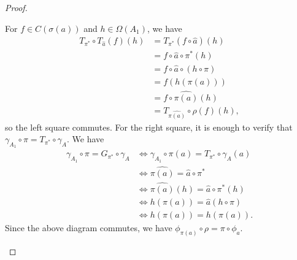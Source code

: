 \documentclass[10pt]{mypackage}
\begin{document}
\begin{proof}
\begin{enumerate}[(1)]
      For $f\in C\left(\sigma\left(a\right)\right)$ and $h\in \Omega\left(A_1\right)$, we have
      \begin{align*}
        T_{\pi^{\ast}}\circ T_{\hat{a}}\left(f\right)\left(h\right) &= T_{\pi^{\ast}}\left(f\circ \hat{a}\right)\left(h\right)\\
                                                                    &= f\circ\hat{a}\circ\pi^{\ast}\left(h\right)\\
                                                                    &= f\circ\hat{a}\circ\left(h\circ\pi\right)\\
                                                                    &= f\left(h\left(\pi\left(a\right)\right)\right)\\
                                                                    &= f\circ \widehat{\pi\left(a\right)}\left(h\right)\\
                                                                    &= T_{\widehat{\pi\left(a\right)}}\circ \rho\left(f\right)\left(h\right),
      \end{align*}
      so the left square commutes. For the right square, it is enough to verify that $\gamma_{A_1}\circ\pi = T_{\pi^{\ast}}\circ \gamma_A$. We have
      \begin{align*}
        \gamma_{A_1}\circ\pi = G_{\pi^{\ast}}\circ\gamma_A &\Leftrightarrow \gamma_{A_1}\circ\pi \left(a\right) = T_{\pi^{\ast}}\circ \gamma_A\left(a\right)\\
                                                           &\Leftrightarrow \widehat{\pi\left(a\right)} = \hat{a}\circ \pi^{\ast}\\
                                                           &\Leftrightarrow \widehat{\pi\left(a\right)}\left(h\right) = \hat{a}\circ\pi^{\ast}\left(h\right)\\
                                                           &\Leftrightarrow h\left(\pi\left(a\right)\right) = \hat{a}\left(h\circ\pi\right)\\
                                                           &\Leftrightarrow h\left(\pi\left(a\right)\right) = h\left(\pi\left(a\right)\right).
      \end{align*}
      Since the above diagram commutes, we have $\phi_{\pi\left(a\right)}\circ\rho = \pi\circ \phi_{a}$.\newline


\end{enumerate}
\end{proof}
\end{document}
